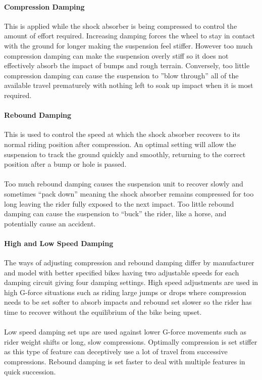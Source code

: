 	\paragraph{Compression Damping} 
		This is applied while the shock absorber is being compressed to control the amount of effort required. Increasing damping forces the wheel to stay in contact with the ground for longer making the suspension feel stiffer. However too much compression damping can make the suspension overly stiff so it does not effectively absorb the impact of bumps and rough terrain. Conversely, too little compression damping can cause the suspension to ”blow through” all of the available travel prematurely with nothing left to soak up impact when it is most required. 
	\paragraph{Rebound Damping}
		This is used to control the speed at which the shock absorber recovers to its normal riding position after compression. An optimal setting will allow the suspension to track the ground quickly and smoothly, returning to the correct position after a bump or hole is passed. 
		\\\\
		Too much rebound damping causes the suspension unit to recover slowly and sometimes “pack down” meaning the shock absorber remains compressed for too long leaving the rider fully exposed to the next impact. Too little rebound damping can cause the suspension to “buck” the rider, like a horse, and potentially cause an accident.
	\paragraph{High and Low Speed Damping} 
		The ways of adjusting compression and rebound damping differ by manufacturer and model with better specified bikes having two adjustable speeds for each damping circuit giving four damping settings. High speed adjustments are used in high G-force situations such as riding large jumps or drops where compression needs to be set softer to absorb impacts and rebound set slower so the rider has time to recover without the equilibrium of the bike being upset.
		\\\\
		Low speed damping set ups are used against lower G-force movements such as rider weight shifts or long, slow compressions. Optimally compression is set stiffer as this type of feature can deceptively use a lot of travel from successive compressions. Rebound damping is set faster to deal with multiple features in quick succession.

